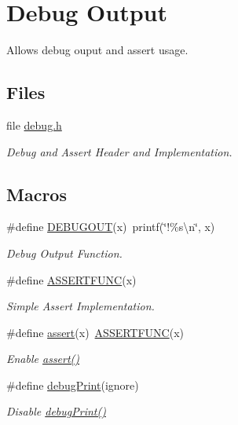 \hypertarget{group__debug}{\section{Debug Output}
\label{group__debug}
}


Allows debug ouput and assert usage.  


\subsection*{Files}
\begin{DoxyCompactItemize}
\item 
file \hyperlink{debug_8h}{debug.\-h}
\begin{DoxyCompactList}\small\item\em Debug and Assert Header and Implementation. \end{DoxyCompactList}\end{DoxyCompactItemize}
\subsection*{Macros}
\begin{DoxyCompactItemize}
\item 
\#define \hyperlink{group__debug_ga19525f7b34cac5693e8cd76d113de4ea}{D\-E\-B\-U\-G\-O\-U\-T}(x)~printf(\char`\"{}!\%s\textbackslash{}n\char`\"{}, x)
\begin{DoxyCompactList}\small\item\em Debug Output Function. \end{DoxyCompactList}\item 
\#define \hyperlink{group__debug_ga9dfd1281735240dcb36d5f605013d40e}{A\-S\-S\-E\-R\-T\-F\-U\-N\-C}(x)
\begin{DoxyCompactList}\small\item\em Simple Assert Implementation. \end{DoxyCompactList}\item 
\#define \hyperlink{group__debug_gaf576bf8ffa22a44e53018c67095ffbf0}{assert}(x)~\hyperlink{group__debug_ga9dfd1281735240dcb36d5f605013d40e}{A\-S\-S\-E\-R\-T\-F\-U\-N\-C}(x)
\begin{DoxyCompactList}\small\item\em Enable \hyperlink{group__debug_gaf576bf8ffa22a44e53018c67095ffbf0}{assert()} \end{DoxyCompactList}\item 
\#define \hyperlink{group__debug_gada1787bea8c10cd89775d6918f6fd324}{debug\-Print}(ignore)
\begin{DoxyCompactList}\small\item\em Disable \hyperlink{group__debug_gada1787bea8c10cd89775d6918f6fd324}{debug\-Print()} \end{DoxyCompactList}\end{DoxyCompactItemize}


